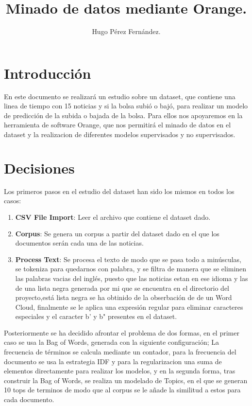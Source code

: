 \documentclass[runningheads]{llncs}
\begin{document}
\title{Minado de datos mediante Orange.}
\author{Hugo Pérez Fernández.  
}
\maketitle
    
\section{Introducción}

En este documento se realizará un estudio sobre un dataset, que contiene una linea de tiempo con 15 noticias y si la bolsa 
subió o bajó, para realizar un modelo de predicción de la subida o bajada de la bolsa. Para ellos nos apoyaremos en la 
herramienta de software Orange, que nos permitirá el minado de datos en el dataset y la realizacion de diferentes modelos 
supervisados y no supervisados.

\section{Decisiones}

Los primeros pasos en el estudio del dataset han sido los mismos en todos los casos:

\begin{enumerate}
    \item \textbf{CSV File Import}: Leer el archivo que contiene el dataset dado.
    \item \textbf{Corpus}: Se genera un corpus a partir del dataset dado en el que los documentos serán cada una de las
        noticias.
    \item \textbf{Process Text}: Se procesa el texto de modo que se pasa todo a minúsculas, se tokeniza para quedarnos con palabra, 
        y se filtra de manera que se eliminen las palabras vacias del inglés, puesto que las noticias estan en ese idioma y las de 
        una lista negra generada por mi que se encuentra en el directorio del proyecto,está lista negra se ha obtinido de la obserbación de 
        de un Word Cloud, finalmente se le aplica una expresión regular para eliminar caracteres especiales y el caracter b' y b" 
        presentes en el dataset.
\end{enumerate}

Posteriormente se ha decidido afrontar el problema de dos formas, en el primer caso se usa la Bag of Words, generada con la siguiente configuración; 
La frecuencia de términos se calcula mediante un contador, para la frecuencia del documento se usa la estrategia IDF y para la regularizacion una suma 
de elementos directamente para realizar los modelos, y en la segunda forma, tras construir la Bag of Words, se realiza un modelado de Topics, en el que se 
generan 10 tops de terminos de modo que al corpus se le añade la similitud a estos para cada documento.
\end{document}
